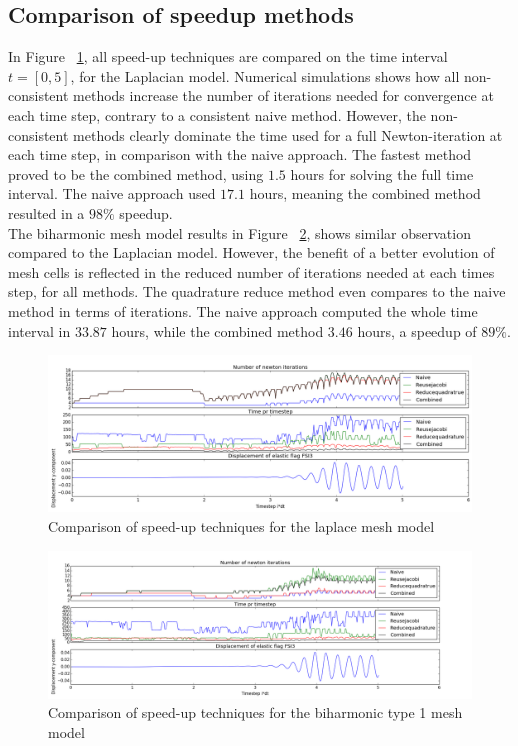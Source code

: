 \subsection{Comparison of speedup methods}
In Figure ~\ref{fig:lap_it}, all speed-up techniques are compared on the time interval $t = [0, 5]$, for the Laplacian model. Numerical simulations shows how all non-consistent methods increase the number of iterations needed for convergence at each time step, contrary to a consistent naive method. However, the non-consistent methods clearly dominate the time used for a full Newton-iteration at each time step, in comparison with the naive approach. The fastest method proved to be the combined method, using $1.5$ hours for solving the full time interval. The naive approach used $17.1$ hours, meaning the combined method resulted in a $98 \%$ speedup. \\

The biharmonic mesh model results in Figure ~\ref{fig:bi_it}, shows  similar observation compared to the Laplacian model. However, the benefit of a better evolution of mesh cells is reflected in the reduced number of iterations needed at each times step, for all methods. The quadrature reduce method even compares to the naive method in terms of iterations. The naive approach computed the whole time interval in $33.87$ hours, while the combined method  $3.46$ hours, a speedup of $89\%$.

\newpage

\begin{figure}[h!]
 \includegraphics[scale=0.38]{./Fig/itercompare.png}
 \caption{Comparison of speed-up techniques for the laplace mesh model}
 \label{fig:lap_it}
\end{figure}

\begin{figure}[h!]
 \includegraphics[scale=0.38]{./Fig/bi_compareit.png}
 \caption{Comparison of speed-up techniques for the biharmonic type 1 mesh model}
  \label{fig:bi_it}
\end{figure}


